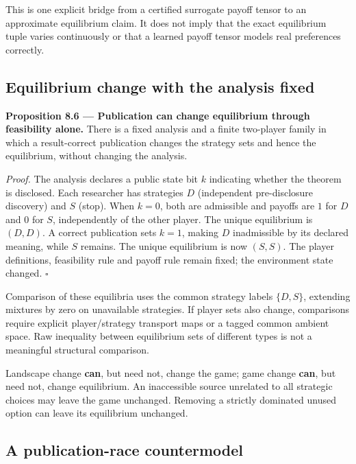 \documentclass[11pt,a4paper]{article}
\begin{document}
This is one explicit bridge from a certified surrogate payoff tensor to
an approximate equilibrium claim. It does not imply that the exact
equilibrium tuple varies continuously or that a learned payoff tensor
models real preferences correctly.

\subsection{Equilibrium change with the analysis
fixed}\label{equilibrium-change-with-the-analysis-fixed}


\textbf{Proposition 8.6 --- Publication can change equilibrium through
feasibility alone.} There is a fixed analysis and a finite two-player
family in which a result-correct publication changes the strategy sets
and hence the equilibrium, without changing the analysis.

\emph{Proof.} The analysis declares a public state bit \(k\) indicating
whether the theorem is disclosed. Each researcher has strategies \(D\)
(independent pre-disclosure discovery) and \(S\) (stop). When \(k=0\),
both are admissible and payoffs are \(1\) for \(D\) and \(0\) for \(S\),
independently of the other player. The unique equilibrium is \((D,D)\).
A correct publication sets \(k=1\), making \(D\) inadmissible by its
declared meaning, while \(S\) remains. The unique equilibrium is now
\((S,S)\). The player definitions, feasibility rule and payoff rule
remain fixed; the environment state changed. \(\square\)

Comparison of these equilibria uses the common strategy labels
\(\{D,S\}\), extending mixtures by zero on unavailable strategies. If
player sets also change, comparisons require explicit player/strategy
transport maps or a tagged common ambient space. Raw inequality between
equilibrium sets of different types is not a meaningful structural
comparison.

Landscape change \textbf{can}, but need not, change the game; game
change \textbf{can}, but need not, change equilibrium. An inaccessible
source unrelated to all strategic choices may leave the game unchanged.
Removing a strictly dominated unused option can leave its equilibrium
unchanged.

\subsection{A publication-race
countermodel}\label{a-publication-race-countermodel}
\end{document}

